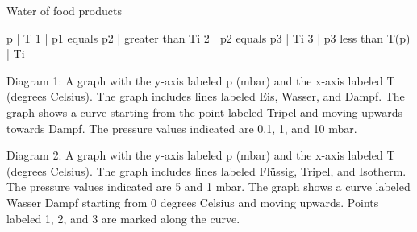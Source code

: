 Water of food products

p | T
1 | p1 equals p2 | greater than Ti
2 | p2 equals p3 | Ti
3 | p3 less than T(p) | Ti

Diagram 1:
A graph with the y-axis labeled p (mbar) and the x-axis labeled T (degrees Celsius). The graph includes lines labeled Eis, Wasser, and Dampf. The graph shows a curve starting from the point labeled Tripel and moving upwards towards Dampf. The pressure values indicated are 0.1, 1, and 10 mbar.

Diagram 2:
A graph with the y-axis labeled p (mbar) and the x-axis labeled T (degrees Celsius). The graph includes lines labeled Flüssig, Tripel, and Isotherm. The pressure values indicated are 5 and 1 mbar. The graph shows a curve labeled Wasser Dampf starting from 0 degrees Celsius and moving upwards. Points labeled 1, 2, and 3 are marked along the curve.